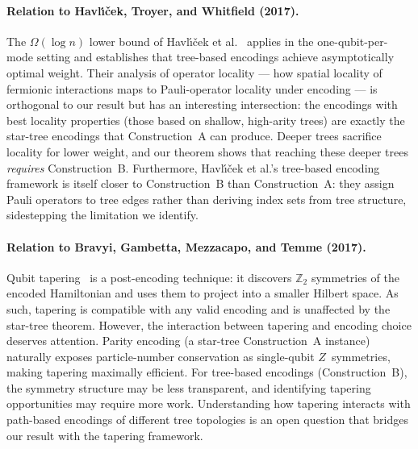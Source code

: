\paragraph{Relation to Havl\'{\i}\v{c}ek, Troyer, and Whitfield (2017).}
The $\Omega(\log n)$ lower bound of Havl\'{\i}\v{c}ek et
al.~\cite{havlicek2017} applies in the one-qubit-per-mode setting
and establishes that tree-based encodings achieve asymptotically
optimal weight.  Their analysis of operator locality --- how spatial
locality of fermionic interactions maps to Pauli-operator locality
under encoding --- is orthogonal to our result but has an interesting
intersection: the encodings with best locality properties (those
based on shallow, high-arity trees) are exactly the star-tree
encodings that Construction~A can produce.  Deeper trees sacrifice
locality for lower weight, and our theorem shows that reaching these
deeper trees \emph{requires} Construction~B.  Furthermore,
Havl\'{\i}\v{c}ek et al.'s tree-based encoding framework is itself
closer to Construction~B than Construction~A: they assign Pauli
operators to tree edges rather than deriving index sets from tree
structure, sidestepping the limitation we identify.

\paragraph{Relation to Bravyi, Gambetta, Mezzacapo, and Temme (2017).}
Qubit tapering~\cite{bravyi2017tapering} is a post-encoding
technique: it discovers $\mathbb{Z}_2$ symmetries of the encoded
Hamiltonian and uses them to project into a smaller Hilbert space.
As such, tapering is compatible with any valid encoding and is
unaffected by the star-tree theorem.  However, the interaction
between tapering and encoding choice deserves attention.  Parity
encoding (a star-tree Construction~A instance) naturally exposes
particle-number conservation as single-qubit $Z$~symmetries,
making tapering maximally efficient.  For tree-based encodings
(Construction~B), the symmetry structure may be less transparent,
and identifying tapering opportunities may require more work.
Understanding how tapering interacts with path-based encodings of
different tree topologies is an open question that bridges our
result with the tapering framework.

